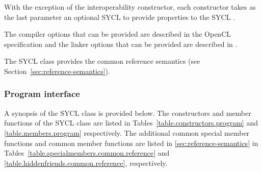 With the exception of the interoperability constructor, each constructor takes as the last
parameter an optional SYCL  to provide properties to
the SYCL .

The compiler options that can be provided are described in the OpenCL specification \cite[p.~145, \S~5.6.4]{opencl12} and the linker options that can be provided are described in \cite[p.~148,\S~5.6.5]{opencl12}.

The SYCL  class provides the common reference semantics
(see Section~\ref{sec:reference-semantics}).

\subsubsection{Program interface}

A synopsis of the SYCL  class is provided below. The constructors and member functions of the SYCL  class are listed in Tables~\ref{table.constructors.program} and \ref{table.members.program} respectively. The additional common special member functions and common member functions are listed in
\ref{sec:reference-semantics} in Tables~\ref{table.specialmembers.common.reference} and \ref{table.hiddenfriends.common.reference}, respectively.


